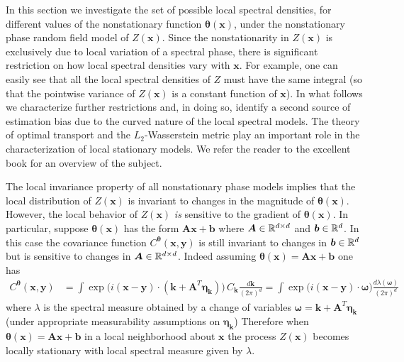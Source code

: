 \documentclass[10pt,noinfoline]{imsart}
\newcommand{\bs}{\boldsymbol}
\begin{document}
In this section we investigate the set of possible local spectral densities, for different values of the nonstationary function $\bs \theta(\bs x)$, under the nonstationary phase random field model of $Z(\bs x)$. Since the nonstationarity in $Z(\bs x)$ is exclusively due to local variation of a spectral phase, there is significant restriction on how local spectral densities vary with $\bs x$. For example, one can easily see that all the local spectral densities of $Z$ must have the same integral (so that the pointwise variance of $Z(\bs x)$ is a constant function of $\bs x$). In what follows we characterize further restrictions and, in doing so, identify a second source of estimation bias due to the curved nature of the local spectral models. The theory of optimal transport and the $L_2$-Wasserstein metric play an important role in the characterization of local stationary models. We refer the reader to the excellent book \cite{villani2003topics} for an overview of the subject. 



The local invariance property of all nonstationary phase models implies that the local distribution of $Z(\bs x)$ is invariant to changes in the magnitude of $\bs \theta(\bs x)$. However, the local behavior of $Z(\bs x)$ \textit{is} sensitive to the gradient of $\bs \theta(\bs x)$. In particular, suppose $\bs\theta(\bs x)$ has the form $\bs A \bs x + \bs b$  where $\bs A\in \Bbb R^{d\times d}$ and $\bs b \in \Bbb R^d$. In this case the covariance function $C^{\bs \theta}(\bs x,\bs y)$ is still invariant to changes in $\bs b \in \Bbb R^d$ but is sensitive to changes in $\bs A\in \Bbb R^{d\times d}$. Indeed assuming $\bs\theta(\bs x)=\bs A \bs x + \bs b$ one has
\begin{align}
C^{\bs \theta}(\bs x,\bs y)
&=\int  \exp\!\big(i(\bs x-\bs y)\!\cdot\! (\bs k + \bs A^T\bs\eta_{\bs k})\big) \, C_{\bs k}\frac{d\bs k}{(2\pi)^d}
=\int\exp\!\big(i(\bs x-\bs y)\!\cdot\! \bs\omega\big)  \frac{d\lambda(\bs \omega)}{(2\pi)^d} \label{eq: local spectral density for nonstationary phase}
\end{align} 
where $\lambda$ is the spectral measure obtained by a change of variables $\bs\omega = \bs k + \bs A^T\bs\eta_{\bs k}$ (under appropriate measurability assumptions on $\bs \eta_{\bs k}$) Therefore when $\bs\theta(\bs x) = \bs A \bs x + \bs b$ in a local neighborhood about $\bs x$ the process $Z(\bs x)$ becomes locally stationary with local spectral measure given by $\lambda$. 
\end{document}
